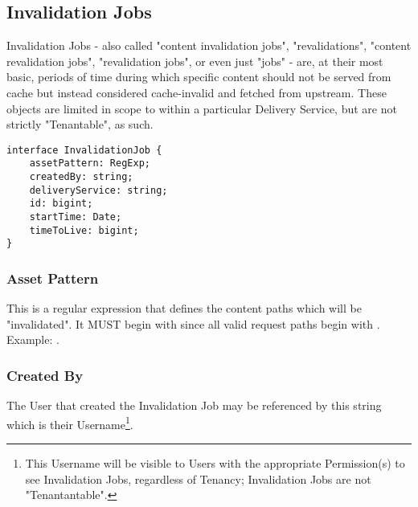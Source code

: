 %
%

\subsection{Invalidation Jobs}
Invalidation Jobs - also called "content invalidation jobs", "revalidations",
"content revalidation jobs", "revalidation jobs", or even just "jobs" - are, at
their most basic, periods of time during which specific content should not be
served from cache but instead considered cache-invalid and fetched from
upstream. These objects are limited in scope to within a particular Delivery
Service, but are not strictly "Tenantable", as such.

\begin{codelisting}
\label{code:datamodel:invalidation-job}
\begin{verbatim}
interface InvalidationJob {
	assetPattern: RegExp;
	createdBy: string;
	deliveryService: string;
	id: bigint;
	startTime: Date;
	timeToLive: bigint;
}
\end{verbatim}
\end{codelisting}

\subsubsection{Asset Pattern}
This is a regular expression that defines the content paths which will be
"invalidated". It MUST begin with \code{/} since all valid request paths begin
with \code{/}. Example: .

\subsubsection{Created By}
The User that created the Invalidation Job may be referenced by this string
which is their Username\footnote{This Username will be visible to Users with the
appropriate Permission(s) to see Invalidation Jobs, regardless of Tenancy;
Invalidation Jobs are not "Tenantantable".}.

